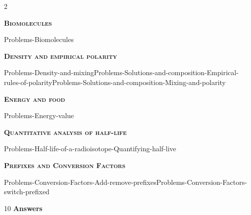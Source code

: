 \documentclass[main.tex]{subfiles}
\begin{document}
\newpage
\fancyhfoffset[E,O]{0pt}
\setlength{\columnsep}{30pt}
\begin{conclusion}
\end{conclusion}
\begin{multicols*}{2}\setcounter{numA}{1}  %







{\raggedright\textsc{\textbf{Biomolecules}}\par}{Problems-Biomolecules}
 
 {\raggedright\textsc{\textbf{Density and empirical polarity}}\par}{Problems-Density-and-mixing}{Problems-Solutions-and-composition-Empirical-rules-of-polarity}{Problems-Solutions-and-composition-Mixing-and-polarity}
 
 {\raggedright\textsc{\textbf{Energy and food	}}\par}{Problems-Energy-value}
  {\raggedright\textsc{\textbf{Quantitative analysis of half-life	}}\par}{Problems-Half-life-of-a-radioisotope-Quantifying-half-live		}
 
 {\raggedright\textsc{\textbf{ Prefixes and Conversion Factors}}\par}{Problems-Conversion-Factors-Add-remove-prefixes}{Problems-Conversion-Factors-switch-prefixed}
%


 
 

\end{multicols*}
\newpage
\begin{answersenvironment}
\begin{minipage}[c]{1\textwidth}
\begin{localsize}{10}
{\Large \bf Answers}
    \printsolutions[byID={1,3,5,7,9,11,13,15,19,21,23,25 }]
\end{localsize}
\end{minipage}\end{answersenvironment}
\end{document}
